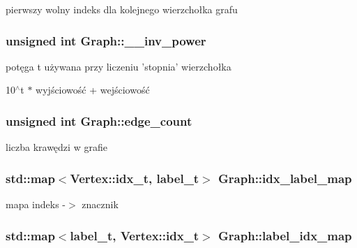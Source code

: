 pierwszy wolny indeks dla kolejnego wierzchołka grafu 

\hypertarget{classGraph_a53211b7cd85e28093bbe540e5a2ec21d}{
\subsubsection[{\-\_\-\-\_\-inv\-\_\-power}]{\setlength{\rightskip}{0pt plus 5cm}unsigned int Graph\-::\-\_\-\-\_\-inv\-\_\-power\hspace{0.3cm}{\ttfamily [private]}}}\label{classGraph_a53211b7cd85e28093bbe540e5a2ec21d}


potęga t używana przy liczeniu 'stopnia' wierzchołka 

10$^\wedge$t $\ast$ wyjściowość + wejściowość \hypertarget{classGraph_ad84b4512d3366d236491358b6314bc47}{
\subsubsection[{edge\-\_\-count}]{\setlength{\rightskip}{0pt plus 5cm}unsigned int Graph\-::edge\-\_\-count\hspace{0.3cm}{\ttfamily [private]}}}\label{classGraph_ad84b4512d3366d236491358b6314bc47}


liczba krawędzi w grafie 

\hypertarget{classGraph_a6472b8bfc461dc9081b609b28e27d2b0}{
\subsubsection[{idx\-\_\-label\-\_\-map}]{\setlength{\rightskip}{0pt plus 5cm}std\-::map$<${\bf Vertex\-::idx\-\_\-t}, {\bf label\-\_\-t}$>$ Graph\-::idx\-\_\-label\-\_\-map\hspace{0.3cm}{\ttfamily [private]}}}\label{classGraph_a6472b8bfc461dc9081b609b28e27d2b0}


mapa indeks -\/$>$ znacznik 

\hypertarget{classGraph_ac2083a954ecbb76a242deed60755fd07}{
\subsubsection[{label\-\_\-idx\-\_\-map}]{\setlength{\rightskip}{0pt plus 5cm}std\-::map$<${\bf label\-\_\-t}, {\bf Vertex\-::idx\-\_\-t}$>$ Graph\-::label\-\_\-idx\-\_\-map\hspace{0.3cm}{\ttfamily [private]}}}\label{classGraph_ac2083a954ecbb76a242deed60755fd07}


